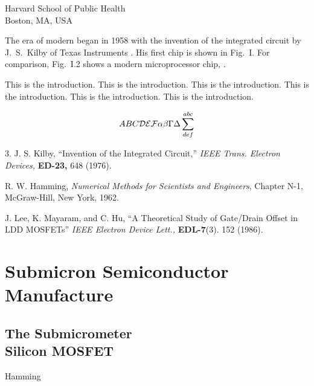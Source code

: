 \documentclass{wileySix}
\begin{document}
\begin{introduction}


{Harvard School of Public Health\\
Boston, MA, USA}

The era of modern  
began in 1958 with the invention of the
integrated circuit by J.~S.~Kilby
 of Texas Instruments \cite{kilby}.
His first chip is shown in Fig.~I. For comparison,
Fig.~I.2 shows a modern microprocessor chip, \cite{beren}.


This is the introduction.
This is the introduction.
This is the introduction.
This is the introduction.
This is the introduction.
This is the introduction.

\begin{equation}
ABC {\cal DEF} \alpha\beta\Gamma\Delta\sum^{abc}_{def}
\end{equation}


\begin{chapreferences}{3.}
J. S. Kilby,
``Invention of the Integrated Circuit,'' {\it IEEE Trans. Electron Devices,}
{\bf ED-23,} 648 (1976).

R. W. Hamming,
                 {\it Numerical Methods for Scientists and 
                 Engineers}, Chapter N-1, McGraw-Hill, 
                 New York, 1962.

J. Lee, K. Mayaram, and C. Hu, ``A Theoretical
               Study of Gate/Drain Offset in LDD MOSFETs''
                     {\it IEEE Electron Device Lett.,} {\bf EDL-7}(3). 152 
                     (1986).
\end{chapreferences}
\end{introduction}


\part[Submicron Semiconductor Manufacture]
{Submicron Semiconductor\\ Manufacture}


\chapter[The Submicrometer Silicon MOSFET]
{The Submicrometer\\ Silicon MOSFET}


{Hamming \cite{hamming}}
\end{document}

